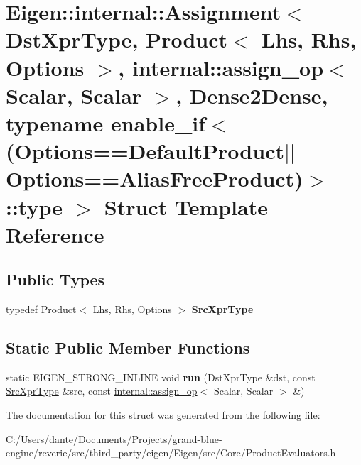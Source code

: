 \hypertarget{struct_eigen_1_1internal_1_1_assignment_3_01_dst_xpr_type_00_01_product_3_01_lhs_00_01_rhs_00_01210f0144945968db9352753c942f6951}{}\section{Eigen\+::internal\+::Assignment$<$ Dst\+Xpr\+Type, Product$<$ Lhs, Rhs, Options $>$, internal\+::assign\+\_\+op$<$ Scalar, Scalar $>$, Dense2\+Dense, typename enable\+\_\+if$<$(Options==Default\+Product$\vert$$\vert$\+Options==Alias\+Free\+Product)$>$\+::type $>$ Struct Template Reference}
\label{struct_eigen_1_1internal_1_1_assignment_3_01_dst_xpr_type_00_01_product_3_01_lhs_00_01_rhs_00_01210f0144945968db9352753c942f6951}
\subsection*{Public Types}
\begin{DoxyCompactItemize}
\item 
\mbox{\label{struct_eigen_1_1internal_1_1_assignment_3_01_dst_xpr_type_00_01_product_3_01_lhs_00_01_rhs_00_01210f0144945968db9352753c942f6951_a8b6808aca61ff57dd4770fd010da12d8}} 
typedef \mbox{\hyperlink{class_eigen_1_1_product}{Product}}$<$ Lhs, Rhs, Options $>$ {\bfseries Src\+Xpr\+Type}
\end{DoxyCompactItemize}
\subsection*{Static Public Member Functions}
\begin{DoxyCompactItemize}
\item 
\mbox{\label{struct_eigen_1_1internal_1_1_assignment_3_01_dst_xpr_type_00_01_product_3_01_lhs_00_01_rhs_00_01210f0144945968db9352753c942f6951_a0281c55ac8f6bd34576aeea23072a800}} 
static E\+I\+G\+E\+N\+\_\+\+S\+T\+R\+O\+N\+G\+\_\+\+I\+N\+L\+I\+NE void {\bfseries run} (Dst\+Xpr\+Type \&dst, const \mbox{\hyperlink{class_eigen_1_1_product}{Src\+Xpr\+Type}} \&src, const \mbox{\hyperlink{struct_eigen_1_1internal_1_1assign__op}{internal\+::assign\+\_\+op}}$<$ Scalar, Scalar $>$ \&)
\end{DoxyCompactItemize}


The documentation for this struct was generated from the following file\+:\begin{DoxyCompactItemize}
\item 
C\+:/\+Users/dante/\+Documents/\+Projects/grand-\/blue-\/engine/reverie/src/third\+\_\+party/eigen/\+Eigen/src/\+Core/Product\+Evaluators.\+h\end{DoxyCompactItemize}

